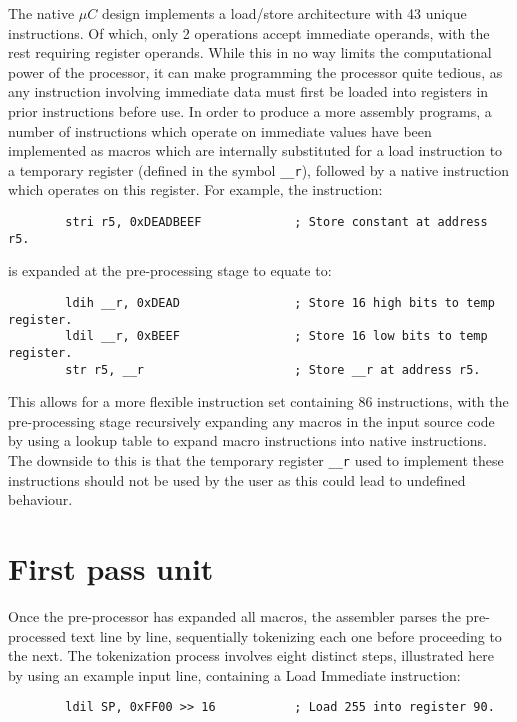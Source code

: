 \documentclass[12pt,twoside]{report}
\begin{document}
The native $\mu C$ design implements a load/store architecture with 43
unique instructions. Of which, only 2 operations accept immediate
operands, with the rest requiring register operands. While this in no
way limits the computational power of the processor, it can make
programming the processor quite tedious, as any instruction involving
immediate data must first be loaded into registers in prior
instructions before use. In order to produce a more assembly programs,
a number of instructions which operate on immediate values have been
implemented as macros which are internally substituted for a load
instruction to a temporary register (defined in the symbol
\texttt{\_\_r}), followed by a native instruction which operates on
this register. For example, the instruction:

\begin{verbatim}
        stri r5, 0xDEADBEEF             ; Store constant at address r5.
\end{verbatim}

\noindent
is expanded at the pre-processing stage to equate to:

\begin{verbatim}
        ldih __r, 0xDEAD                ; Store 16 high bits to temp register.
        ldil __r, 0xBEEF                ; Store 16 low bits to temp register.
        str r5, __r                     ; Store __r at address r5.
\end{verbatim}

\noindent
This allows for a more flexible instruction set containing 86
instructions, with the pre-processing stage recursively expanding any
macros in the input source code by using a lookup table to expand
macro instructions into native instructions. The downside to this is
that the temporary register \texttt{\_\_r} used to implement these
instructions should not be used by the user as this could lead to
undefined behaviour.

\section{First pass unit}

Once the pre-processor has expanded all macros, the assembler parses
the pre-processed text line by line, sequentially tokenizing each one
before proceeding to the next. The tokenization process involves eight
distinct steps, illustrated here by using an example input line,
containing a Load Immediate instruction:

\begin{verbatim}
        ldil SP, 0xFF00 >> 16           ; Load 255 into register 90.
\end{verbatim}
\end{document}
